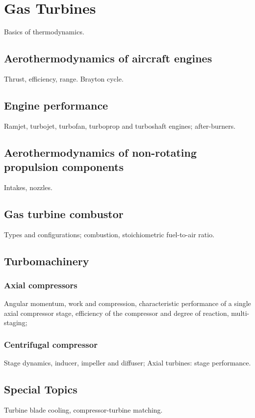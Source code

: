 \section{Gas Turbines}

Basics of thermodynamics.

\subsection{Aerothermodynamics of aircraft engines}
Thrust, efficiency, range. Brayton cycle.

\subsection{Engine performance}
Ramjet, turbojet, turbofan, turboprop and turboshaft engines; after-burners.

\subsection{Aerothermodynamics of non-rotating propulsion components}
Intakes, nozzles.

\subsection{Gas turbine combustor}
Types and configurations; combustion, stoichiometric fuel-to-air ratio.

\subsection{Turbomachinery}

\subsubsection{Axial compressors}
Angular momentum, work and compression, characteristic performance of a single axial compressor stage, efficiency of the compressor and degree of reaction, multi-staging;

\subsubsection{Centrifugal compressor}
Stage dynamics, inducer, impeller and diffuser; Axial turbines: stage performance.

\subsection{Special Topics}
Turbine blade cooling, compressor-turbine matching.

